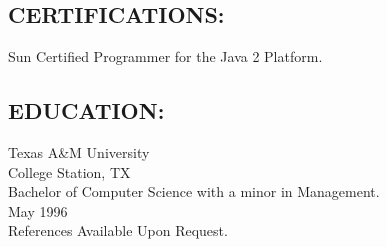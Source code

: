 \documentclass[10pt]{report}
\begin{document}
%

\subsection*{CERTIFICATIONS:}
Sun Certified Programmer for the Java 2 Platform.

\subsection*{EDUCATION:}
Texas A\&M University \\
College Station, TX \\
Bachelor of Computer Science with a minor in Management. \\
May 1996 \\

References Available Upon Request.
\end{document}
